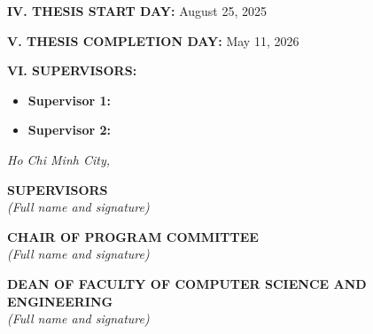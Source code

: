 \newpage
\thispagestyle{empty}

\begin{flushleft}
\noindent \textbf{IV. \hspace{1mm} THESIS START DAY:} August 25, 2025
\end{flushleft}

\vspace{2mm}

\begin{flushleft}
\noindent \textbf{V. \hspace{1mm} THESIS COMPLETION DAY:} May 11, 2026
\end{flushleft}

\vspace{2mm}

\begin{flushleft}
\noindent \textbf{VI. \hspace{1mm} SUPERVISORS:}
\begin{itemize}
    \item \textbf{Supervisor 1:} \supervisorone
    \item \textbf{Supervisor 2:} \supervisortwo
\end{itemize}
\end{flushleft}

\vspace{1cm}

\begin{center}
\textit{Ho Chi Minh City, \makebox[6cm]{\dotfill}}
\end{center}

\noindent
\begin{minipage}[t]{0.45\textwidth}
\centering
\textbf{SUPERVISORS}\\
\large\textit{(Full name and signature)}
\vspace{3cm} %
\end{minipage}
\hfill
\begin{minipage}[t]{0.45\textwidth}
\centering
\textbf{CHAIR OF PROGRAM COMMITTEE}\\
\large\textit{(Full name and signature)}
\vspace{3cm} %
\end{minipage}

\vspace{3cm}

\begin{center}
\textbf{DEAN OF FACULTY OF COMPUTER SCIENCE AND ENGINEERING}\\
\large\textit{(Full name and signature)}
\vspace{3cm} %
\end{center}
